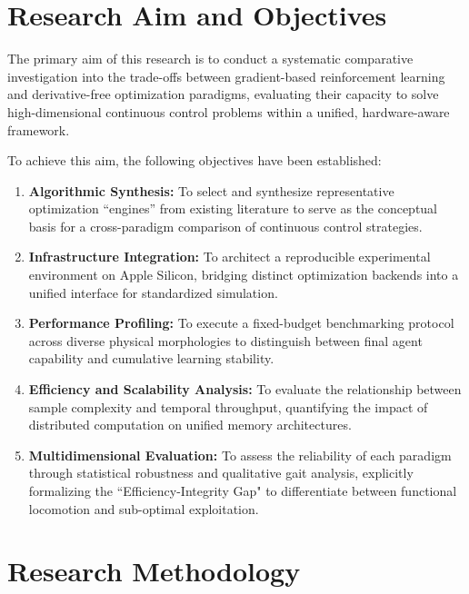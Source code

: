 \section{Research Aim and Objectives}

The primary aim of this research is to conduct a systematic comparative investigation into the trade-offs between gradient-based reinforcement learning and derivative-free optimization paradigms, evaluating their capacity to solve high-dimensional continuous control problems within a unified, hardware-aware framework.

To achieve this aim, the following objectives have been established:

\begin{enumerate}
    \item \textbf{Algorithmic Synthesis:} To select and synthesize representative optimization ``engines'' from existing literature to serve as the conceptual basis for a cross-paradigm comparison of continuous control strategies.
    
    \item \textbf{Infrastructure Integration:} To architect a reproducible experimental environment on Apple Silicon, bridging distinct optimization backends into a unified interface for standardized simulation.
    
    \item \textbf{Performance Profiling:} To execute a fixed-budget benchmarking protocol across diverse physical morphologies to distinguish between final agent capability and cumulative learning stability.
    
    \item \textbf{Efficiency and Scalability Analysis:} To evaluate the relationship between sample complexity and temporal throughput, quantifying the impact of distributed computation on unified memory architectures.
    
    \item \textbf{Multidimensional Evaluation:} To assess the reliability of each paradigm through statistical robustness and qualitative gait analysis, explicitly formalizing the ``Efficiency-Integrity Gap" to differentiate between functional locomotion and sub-optimal exploitation.
\end{enumerate}

\section{Research Methodology}

